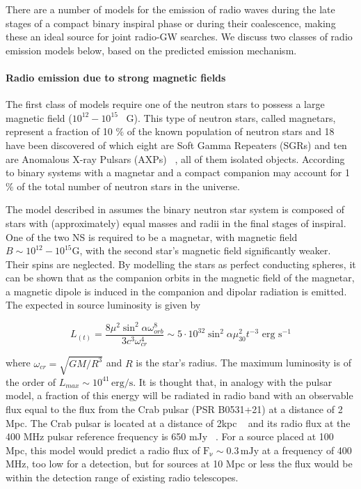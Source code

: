 \documentclass[epsf]{article}
\begin{document}
There are a number of models for the emission of radio
waves during the late stages of a compact binary inspiral phase or during their coalescence,
making these an ideal source for joint radio-GW searches.  We
discuss two classes of radio emission models below, based on the predicted emission mechanism.

\paragraph{Radio emission due to strong magnetic fields}

The first class of models
require one of the neutron stars to possess a large magnetic field
($10^{12} - 10^{15}$ ~G). This type of neutron stars, called magnetars, represent a fraction of 10 $\%$ of the known population of neutron stars \cite{Bogomazov:2009wj} and 18 have been discovered of which eight are Soft Gamma Repeaters (SGRs) and ten are Anomalous X-ray Pulsars (AXPs) ~\cite{magnetar_catalog}, all of them isolated objects. According to \cite{Popov:2005wh} binary systems with a magnetar and a compact companion may account for 1 $\%$ of the total number of neutron stars in the universe. 


The model described in \cite{Lipunov:1996wf} assumes the binary
neutron star system is composed of stars with (approximately) equal
masses and radii in the final stages of inspiral.  One of the two NS
is required to be a magnetar, with magnetic field
$B\sim10^{12}-10^{15} \mathrm{G}$, with the second star's magnetic
field significantly weaker.  Their spins are neglected.  By
modelling the stars as perfect conducting spheres, it can be shown
that as the companion orbits in the magnetic field of the magnetar,
a magnetic dipole is induced in the companion and
dipolar radiation is emitted.  The expected in source luminosity is given by ~\cite{lipunovflux}

\begin{equation}
\label{lipunovflux}
L_(t) = \frac{8\mu^2 \sin^2\alpha \omega_{orb}^8}{3c^3\omega_{cr}^4}
   \sim 5\cdot 10^{32}\sin^2\alpha\mu_{30}^2 t^{-3}\mbox{ erg s}^{-1}
\end{equation}

where $\omega_{cr} = \sqrt{GM/R^3}$ and $R$ is the star's radius.
 The maximum luminosity is of the order
of $L_{max}\sim 10^{41}\,\mathrm{erg/s}$. It is thought that, in
analogy with the pulsar model, a fraction of this energy will be
radiated in radio band with an observable flux equal to the flux from the Crab pulsar (PSR B0531+21) at a distance of 2 Mpc. The Crab pulsar is located at a distance of 2kpc ~\cite{ATNF} and its radio flux at the 400 MHz pulsar reference frequency is 650 mJy ~\cite{Nice:1998dn}. For a source placed at 100 Mpc, this model would predict a radio flux of $\mathrm{F_{\nu}}\sim 0.3\, \mathrm{mJy}$ at a frequency of 400 MHz, too low for a detection, but for sources at 10 Mpc or less the flux would be within the detection range of existing radio telescopes.  
\end{document}
